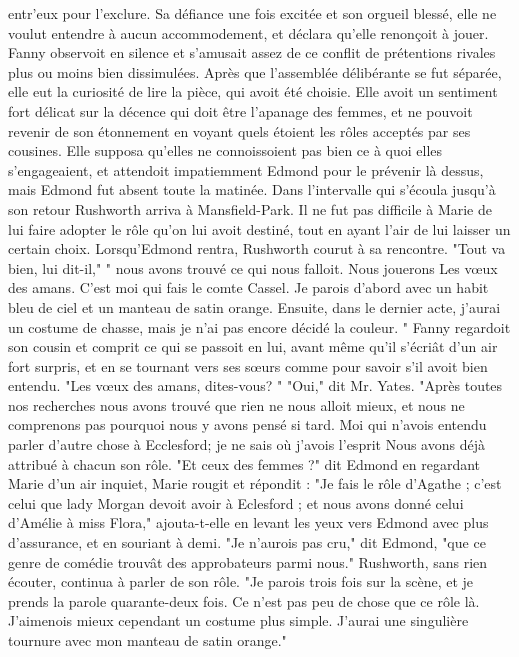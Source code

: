 entr'eux pour l'exclure. Sa défiance une fois excitée et son orgueil blessé, elle ne voulut entendre à aucun accommodement, et déclara qu'elle renonçoit à jouer. Fanny observoit en silence et s'amusait assez de ce conflit de prétentions rivales plus ou moins bien dissimulées. Après que l'assemblée délibérante se fut séparée, elle eut la curiosité de lire la pièce, qui avoit été choisie. Elle avoit un sentiment fort délicat sur la décence qui doit être l'apanage des femmes, et ne pouvoit revenir de son étonnement en voyant quels étoient les rôles acceptés par ses cousines. Elle supposa qu'elles ne connoissoient pas bien ce à quoi elles s'engageaient, et\setcounter{page}{109} attendoit impatiemment Edmond pour le prévenir là dessus, mais Edmond fut absent toute la matinée.
Dans l'intervalle qui s'écoula jusqu'à son retour Rushworth arriva à Mansfield-Park. Il ne fut pas difficile à Marie de lui faire adopter le rôle qu'on lui avoit destiné, tout en ayant l'air de lui laisser un certain choix. Lorsqu'Edmond rentra, Rushworth courut à sa rencontre. "Tout va bien, lui dit-il," " nous avons trouvé ce qui nous falloit. Nous jouerons Les vœux des amans. C'est moi qui fais le comte Cassel. Je parois d'abord avec un habit bleu de ciel et un manteau de satin orange. Ensuite, dans le dernier acte, j'aurai un costume de chasse, mais je n'ai pas encore décidé la couleur. "
Fanny regardoit son cousin et comprit ce qui se passoit en lui, avant même qu'il s'écriât d'un air fort surpris, et en se tournant vers ses sœurs comme pour savoir s'il avoit bien entendu. "Les vœux des amans, dites-vous? "
"Oui," dit Mr. Yates. "Après toutes nos recherches nous avons trouvé que rien ne nous alloit mieux, et nous ne comprenons pas pourquoi nous y avons pensé si tard. Moi qui n'avois entendu parler d'autre chose à Ecclesford; je ne sais où j'avois l'esprit\setcounter{page}{110} Nous avons déjà attribué à chacun son rôle.
"Et ceux des femmes ?" dit Edmond en regardant Marie d'un air inquiet, Marie rougit et répondit : "Je fais le rôle d'Agathe ; c'est celui que lady Morgan devoit avoir à Eclesford ; et nous avons donné celui d'Amélie à miss Flora," ajouta-t-elle en levant les yeux vers Edmond avec plus d'assurance, et en souriant à demi.
"Je n'aurois pas cru," dit Edmond, "que ce genre de comédie trouvât des approbateurs parmi nous."
Rushworth, sans rien écouter, continua à parler de son rôle. "Je parois trois fois sur la scène, et je prends la parole quarante-deux fois. Ce n'est pas peu de chose que ce rôle là. J'aimenois mieux cependant un costume plus simple. J'aurai une singulière tournure avec mon manteau de satin orange."
